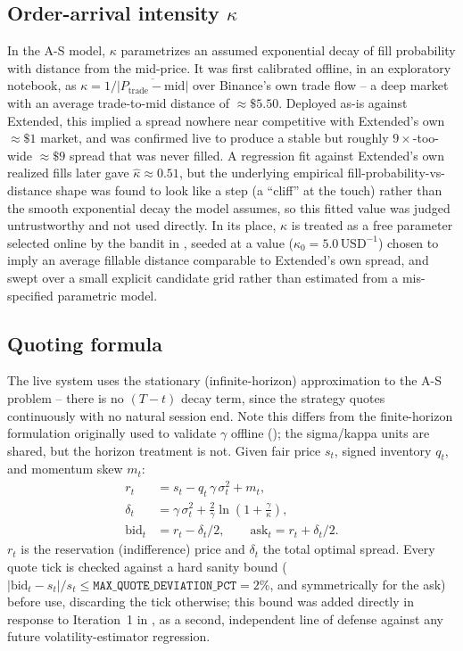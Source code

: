 \documentclass[11pt,a4paper]{article}
\begin{document}
\subsection{Order-arrival intensity $\kappa$}
\label{sec:kappa}

In the A-S model, $\kappa$ parametrizes an assumed exponential decay of fill probability with
distance from the mid-price. It was first calibrated offline, in an exploratory notebook, as
$\kappa = 1/\overline{|P_{\text{trade}} - \text{mid}|}$ over Binance's own trade flow -- a deep
market with an average trade-to-mid distance of $\approx\!\$5.50$. Deployed as-is against
Extended, this implied a spread nowhere near competitive with Extended's own $\approx\!\$1$
market, and was confirmed live to produce a stable but roughly $9\times$-too-wide $\approx\!\$9$
spread that was never filled. A regression fit against Extended's own realized fills later gave
$\hat\kappa\approx 0.51$, but the underlying empirical fill-probability-vs-distance shape was
found to look like a step (a ``cliff'' at the touch) rather than the smooth exponential decay the
model assumes, so this fitted value was judged untrustworthy and not used directly. In its place,
$\kappa$ is treated as a free parameter selected online by the bandit in , seeded
at a value ($\kappa_0=5.0\,\text{USD}^{-1}$) chosen to imply an average fillable distance
comparable to Extended's own spread, and swept over a small explicit candidate grid rather than
estimated from a mis-specified parametric model.

\subsection{Quoting formula}
\label{sec:quotes}

The live system uses the stationary (infinite-horizon) approximation to the A-S problem -- there
is no $(T-t)$ decay term, since the strategy quotes continuously with no natural session end. Note
this differs from the finite-horizon formulation originally used to validate $\gamma$ offline
(); the sigma/kappa units are shared, but the horizon treatment is
not. Given fair price $s_t$, signed inventory $q_t$, and momentum skew $m_t$:
\begin{align}
  r_t &= s_t - q_t\,\gamma\,\sigma_t^{2} + m_t, \label{eq:reservation}\\
  \delta_t &= \gamma\,\sigma_t^{2} + \frac{2}{\gamma}\ln\!\left(1+\frac{\gamma}{\kappa}\right),
    \label{eq:spread}\\
  \text{bid}_t &= r_t - \delta_t/2, \qquad \text{ask}_t = r_t + \delta_t/2. \label{eq:quotes}
\end{align}
$r_t$ is the reservation (indifference) price and $\delta_t$ the total optimal spread. Every
quote tick is checked against a hard sanity bound
($|\text{bid}_t - s_t|/s_t \le \texttt{MAX\_QUOTE\_DEVIATION\_PCT}=2\%$, and symmetrically for the
ask) before use, discarding the tick otherwise; this bound was added directly in response to
Iteration~1 in , as a second, independent line of defense against any
future volatility-estimator regression.
\end{document}
